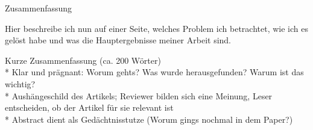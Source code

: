 \begin{center} 
\huge Zusammenfassung
\end{center}

Hier beschreibe ich nun auf einer Seite, welches Problem ich betrachtet, wie ich es gelöst habe
und was die Hauptergebnisse meiner Arbeit sind.

Kurze Zusammenfassung (ca. 200 Wörter)\\
* Klar und prägnant: Worum gehts? Was wurde herausgefunden? Warum ist das wichtig?\\
* Aushängeschild des Artikels; Reviewer bilden sich eine Meinung, Leser entscheiden, ob der Artikel für sie relevant ist\\
* Abstract dient als Gedächtnisstutze (Worum gings nochmal in dem Paper?)

